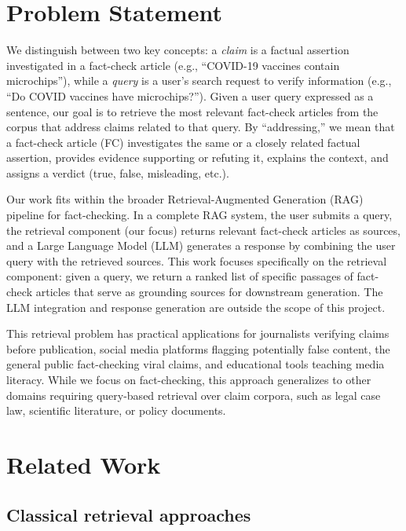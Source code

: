 \documentclass[10pt]{article}
\begin{document}
\section{Problem Statement}

We distinguish between two key concepts: a \emph{claim} is a factual assertion investigated in a fact-check article (e.g., ``COVID-19 vaccines contain microchips''), while a \emph{query} is a user's search request to verify information (e.g., ``Do COVID vaccines have microchips?''). Given a user query expressed as a sentence, our goal is to retrieve the most relevant fact-check articles from the corpus that address claims related to that query. By ``addressing,'' we mean that a fact-check article (FC) investigates the same or a closely related factual assertion, provides evidence supporting or refuting it, explains the context, and assigns a verdict (true, false, misleading, etc.).

Our work fits within the broader Retrieval-Augmented Generation (RAG) pipeline for fact-checking. In a complete RAG system, the user submits a query, the retrieval component (our focus) returns relevant fact-check articles as sources, and a Large Language Model (LLM) generates a response by combining the user query with the retrieved sources. This work focuses specifically on the retrieval component: given a query, we return a ranked list  of specific passages of fact-check articles that serve as grounding sources for downstream generation. The LLM integration and response generation are outside the scope of this project.

This retrieval problem has practical applications for journalists verifying claims before publication, social media platforms flagging potentially false content, the general public fact-checking viral claims, and educational tools teaching media literacy. While we focus on fact-checking, this approach generalizes to other domains requiring query-based retrieval over claim corpora, such as legal case law, scientific literature, or policy documents.


\section{Related Work}
\label{sec:related}

\subsection{Classical retrieval approaches}
\end{document}
